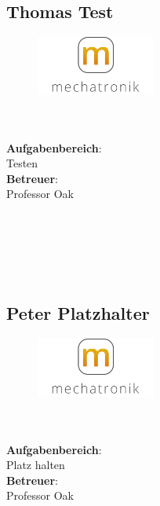 \subsection*{Thomas Test}
\begin{figure}
\begin{center}
  \includegraphics[width=0.35\textwidth]{logoMecha}
\end{center}
\end{figure}
\mbox{}\\
\mbox{}\\
\textbf{Aufgabenbereich}:\\
Testen\\
\textbf{Betreuer}:\\
Professor Oak
\mbox{}\\
\mbox{}\\
\mbox{}\\
\mbox{}\\
\mbox{}\\
\mbox{}\\

\subsection*{Peter Platzhalter}
\begin{figure}
\begin{center}
  \includegraphics[width=0.35\textwidth]{LogoMecha}
\end{center}
\end{figure}
\mbox{}\\
\mbox{}\\
\textbf{Aufgabenbereich}:\\
Platz halten\\
\textbf{Betreuer}:\\
Professor Oak
\mbox{}\\
\mbox{}\\
\mbox{}\\
\mbox{}\\
\mbox{}\\
\newpage